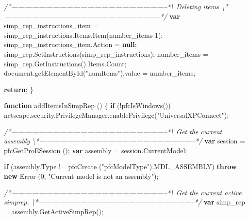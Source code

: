 \documentclass[]{article}
\newenvironment{Shaded}{}{}
\newcommand{\KeywordTok}[1]{\textcolor[rgb]{0.00,0.44,0.13}{\textbf{{#1}}}}
\newcommand{\DecValTok}[1]{\textcolor[rgb]{0.25,0.63,0.44}{{#1}}}
\newcommand{\StringTok}[1]{\textcolor[rgb]{0.25,0.44,0.63}{{#1}}}
\newcommand{\CommentTok}[1]{\textcolor[rgb]{0.38,0.63,0.69}{\textit{{#1}}}}
\newcommand{\OtherTok}[1]{\textcolor[rgb]{0.00,0.44,0.13}{{#1}}}
\newcommand{\FunctionTok}[1]{\textcolor[rgb]{0.02,0.16,0.49}{{#1}}}
\newcommand{\NormalTok}[1]{{#1}}
\begin{document}
\begin{Shaded}
\begin{Highlighting}[]
 
 \CommentTok{/*--------------------------------------------------------------------*\textbackslash{} }
\CommentTok{   Deleting items}
\CommentTok{ \textbackslash{}*--------------------------------------------------------------------*/}               
  \KeywordTok{var} \NormalTok{simp_rep_instructions_item = }\OtherTok{simp_rep_instructions}\NormalTok{.}\OtherTok{Items}\NormalTok{.}\FunctionTok{Item}\NormalTok{(number_items}\DecValTok{-1}\NormalTok{);}
  \OtherTok{simp_rep_instructions_item}\NormalTok{.}\FunctionTok{Action} \NormalTok{= }\KeywordTok{null}\NormalTok{;    }
  \OtherTok{simp_rep}\NormalTok{.}\FunctionTok{SetInstructions}\NormalTok{(simp_rep_instructions);  }
  \NormalTok{number_items = }\OtherTok{simp_rep}\NormalTok{.}\FunctionTok{GetInstructions}\NormalTok{().}\OtherTok{Items}\NormalTok{.}\FunctionTok{Count}\NormalTok{;}
  \OtherTok{document}\NormalTok{.}\FunctionTok{getElementById}\NormalTok{(}\StringTok{"numItems"}\NormalTok{).}\FunctionTok{value} \NormalTok{= number_items;}
  

  
  \KeywordTok{return}\NormalTok{;}
\NormalTok{\}}


    


\KeywordTok{function} \FunctionTok{addItemsInSimpRep} \NormalTok{()}
\NormalTok{\{  }
  \KeywordTok{if} \NormalTok{(!}\FunctionTok{pfcIsWindows}\NormalTok{())}
    \OtherTok{netscape}\NormalTok{.}\OtherTok{security}\NormalTok{.}\OtherTok{PrivilegeManager}\NormalTok{.}\FunctionTok{enablePrivilege}\NormalTok{(}\StringTok{"UniversalXPConnect"}\NormalTok{);}

 \CommentTok{/*--------------------------------------------------------------------*\textbackslash{} }
\CommentTok{   Get the current assembly }
\CommentTok{ \textbackslash{}*--------------------------------------------------------------------*/}  
  \KeywordTok{var} \NormalTok{session = }\FunctionTok{pfcGetProESession} \NormalTok{();}
  \KeywordTok{var} \NormalTok{assembly = }\OtherTok{session}\NormalTok{.}\FunctionTok{CurrentModel}\NormalTok{;}
  
  \KeywordTok{if} \NormalTok{(}\OtherTok{assembly}\NormalTok{.}\FunctionTok{Type} \NormalTok{!= }\FunctionTok{pfcCreate} \NormalTok{(}\StringTok{"pfcModelType"}\NormalTok{).}\FunctionTok{MDL_ASSEMBLY}\NormalTok{)}
    \KeywordTok{throw} \KeywordTok{new} \FunctionTok{Error} \NormalTok{(}\DecValTok{0}\NormalTok{, }\StringTok{"Current model is not an assembly"}\NormalTok{);}
  
 \CommentTok{/*--------------------------------------------------------------------*\textbackslash{} }
\CommentTok{   Get the current active simprep.}
\CommentTok{ \textbackslash{}*--------------------------------------------------------------------*/}  
  \KeywordTok{var} \NormalTok{simp_rep = }\OtherTok{assembly}\NormalTok{.}\FunctionTok{GetActiveSimpRep}\NormalTok{();}
 

\end{Highlighting}
\end{Shaded}
\end{document}
